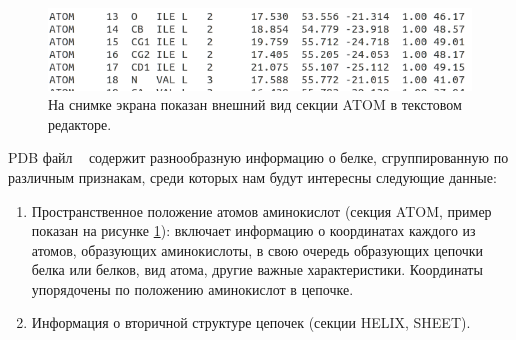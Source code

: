 \begin{figure}
\includegraphics[width=\linewidth]{atom_in_pdb.png}
\caption{\small{На снимке экрана показан внешний вид секции ATOM в текстовом редакторе.
 }}
\label{fig:atom_in_pdb}
\end{figure}


PDB файл ~\cite{pdb} содержит разнообразную информацию о белке, сгруппированную по различным признакам, среди которых нам будут интересны следующие данные: 
\begin{enumerate}
\item Пространственное положение атомов аминокислот (секция ATOM, пример показан на рисунке \ref{fig:atom_in_pdb}):
включает информацию о координатах каждого из атомов, образующих аминокислоты, в свою очередь образующих цепочки белка или белков, вид атома, другие важные характеристики. Координаты упорядочены по положению аминокислот в цепочке.

\item Информация о вторичной структуре цепочек (секции HELIX, SHEET).
\end{enumerate}





